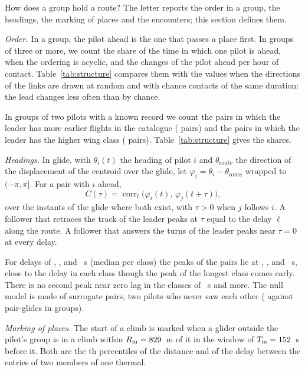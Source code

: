 \documentclass[aps,prl,twocolumn,superscriptaddress,nofootinbib]{revtex4-2}
\begin{document}
How does a group hold a route? The letter reports the order in a group, the headings, the marking of
places and the encounters; this section defines them.

\emph{Order.} In a group, the pilot ahead is the one that passes a place first. In groups of three or
more, we count the share of the time in which one pilot is ahead, when the ordering is acyclic, and the
changes of the pilot ahead per hour of contact. Table~\ref{tab:structure} compares them with the values
when the directions of the links are drawn at random and with chance contacts of the same duration: the
lead changes less often than by chance.

In groups of two pilots with a known record we count the pairs in which the leader has more earlier
flights in the catalogue (\StExpPairs{} pairs) and the pairs in which the leader has the higher wing
class (\StWingPairs{} pairs). Table~\ref{tab:structure} gives the shares.

\emph{Headings.} In glide, with $\theta_i(t)$ the heading of pilot $i$ and $\theta_\mathrm{route}$ the
direction of the displacement of the centroid over the glide, let $\varphi_i = \theta_i -
\theta_\mathrm{route}$ wrapped to $(-\pi,\pi]$. For a pair with $i$ ahead,
\begin{equation}
C(\tau) = \operatorname{corr}_t\bigl(\varphi_i(t),\,\varphi_j(t+\tau)\bigr),
\end{equation}
over the instants of the glide where both exist, with $\tau > 0$ when $j$ follows $i$. A follower that
retraces the track of the leader peaks at $\tau$ equal to the delay $\ell$ along the route. A follower
that answers the turns of the leader peaks near $\tau = 0$ at every delay.

For delays of \StHdLOne, \StHdLTwo, \StHdLThree{} and \StHdLFour~s (median per class) the peaks of the
pairs lie at \StHdPeakOne, \StHdPeakTwo, \StHdPeakThree{} and \StHdPeakFour~s, close to the delay in
each class though the peak of the longest class comes early. There is no second peak near zero lag in
the classes of \StHdLTwo~s and more. The null model is made of surrogate pairs, two pilots who never
saw each other (\StHdChance{} against \StHdGlides{} pair-glides in groups).

\emph{Marking of places.} The start of a climb is marked when a glider outside the pilot's group is in
a climb within $R_\mathrm{m} = 829$~m of it in the window of $T_\mathrm{m} = 152$~s before it.
Both are the \StMkPercentile th percentiles of the distance and of the delay between the entries of two
members of one thermal.
\end{document}
